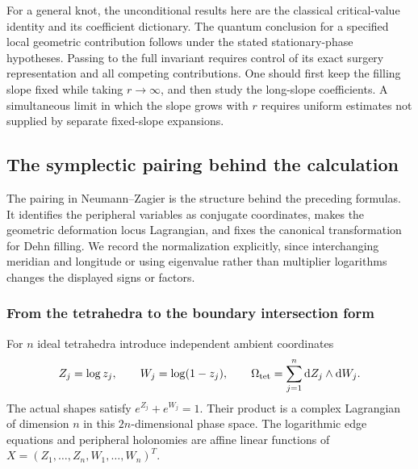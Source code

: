 \documentclass[11pt,a4paper]{article}
\numberwithin{equation}{section}
\theoremstyle{definition}
\theoremstyle{remark}
\newcommand{\dd}{\mathop{}\!\mathrm d}
\begin{document}
For a general knot, the unconditional results here are the classical
critical-value identity and its coefficient dictionary. The quantum
conclusion for a specified local geometric contribution follows under
the stated stationary-phase hypotheses. Passing to the full invariant
requires control of its exact surgery representation and all competing
contributions. One should first keep the filling slope fixed while
taking $r\to\infty$, and then study the long-slope coefficients.
A simultaneous limit in which the slope grows with $r$ requires
uniform estimates not supplied by separate fixed-slope expansions.

\subsection{The symplectic pairing behind the calculation}
\label{sec:NZsymplectic}

The pairing in Neumann--Zagier is the structure behind the preceding
formulas. It identifies the peripheral variables as conjugate coordinates,
makes the geometric deformation locus Lagrangian, and fixes the canonical
transformation for Dehn filling. We record the normalization explicitly,
since interchanging meridian and longitude or using eigenvalue rather
than multiplier logarithms changes the displayed signs or factors.

\subsubsection{From the tetrahedra to the boundary intersection form}

For $n$ ideal tetrahedra introduce independent ambient coordinates
\[
 Z_j=\log z_j,\qquad W_j=\log(1-z_j),\qquad
 \Omega_{\rm tet}=\sum_{j=1}^n\dd Z_j\wedge\dd W_j.
\]
The actual shapes satisfy $e^{Z_j}+e^{W_j}=1$. Their product is a
complex Lagrangian of dimension $n$ in this $2n$-dimensional phase space.
The logarithmic edge equations and peripheral holonomies are affine
linear functions of $X=(Z_1,\ldots,Z_n,W_1,\ldots,W_n)^T$.
\end{document}

